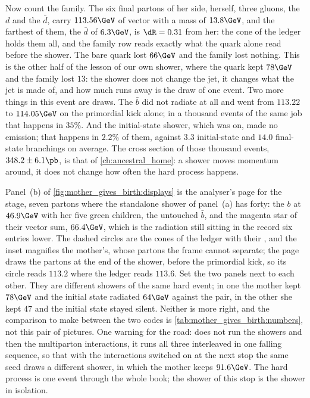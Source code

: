 Now count the family. The six final partons of her side, herself, three
gluons, the $d$ and the $\bar d$, carry $113.56\GeV$ of vector \pt with a
mass of $13.8\GeV$, and the farthest of them, the $\bar d$ of $6.3\GeV$,
is $\dR=0.31$ from her: the cone of the ledger holds them all, and the
family row reads exactly what the quark alone read before the shower. The
bare quark lost $66\GeV$ and the family lost nothing. This is the other
half of the lesson of our own shower, where the quark kept $78\GeV$ and
the family lost $13$: the shower does not change the jet, it changes what
the jet is made of, and how much runs away is the draw of one event. Two
more things in this event are draws. The $\bar b$ did not radiate at all
and went from $113.22$ to $114.05\GeV$ on the primordial kick alone; in a
thousand events of the same job that happens in $35\%$. And the
initial-state shower, which was on, made no emission; that happens in
$2.2\%$ of them, against $3.3$ initial-state and $14.0$ final-state
branchings on average. The cross section of those thousand events,
$348.2\pm6.1\pb$, is that of \cref{ch:ancestral_home}: a shower moves
momentum around, it does not change how often the hard process happens.

Panel~(b) of \cref{fig:mother_gives_birth:displays} is the analyser's page
for the stage, seven partons where the standalone shower of panel~(a) has
forty: the $b$ at $46.9\GeV$ with her five green children, the untouched
$\bar b$, and the magenta star of their vector sum, $66.4\GeV$, which is
the radiation still sitting in the record six entries lower. The dashed
circles are the cones of the ledger with their \pt, and the inset magnifies
the mother's, whose partons the frame cannot separate; the page draws the
partons at the end of the shower, before the primordial kick, so its
circle reads $113.2$ where the ledger reads $113.6$. Set the two panels
next to each other. They are different showers of the same hard event; in
one the mother kept $78\GeV$ and the initial state radiated $64\GeV$
against the pair, in the other she kept $47$ and the initial state stayed
silent. Neither is more right, and the comparison to make between the two
codes is \cref{tab:mother_gives_birth:numbers}, not this pair of pictures.
One warning for the road: \PYTHIA does not run the showers and then the
multiparton interactions, it runs all three interleaved in one falling
\pt sequence, so that with the interactions switched on at the next stop
the same seed draws a different shower, in which the mother keeps
$91.6\GeV$. The hard process is one event through the whole book; the
\CMSSW shower of this stop is the shower in isolation.

